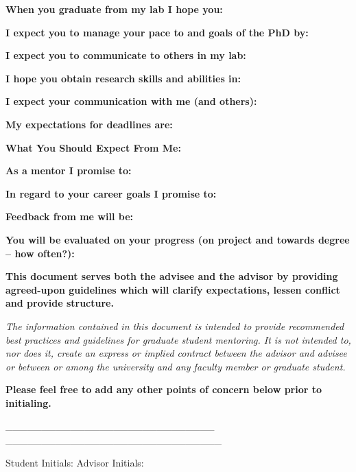 \documentclass[]{article}
\begin{document}
\textbf{When you graduate from my lab I hope you:}

\textbf{I expect you to manage your pace to and goals of the PhD by:\\
}

\textbf{I expect you to communicate to others in my lab:}

\textbf{I hope you obtain research skills and abilities in:}

\textbf{I expect your communication with me (and others):}

\textbf{My expectations for deadlines are:}

\textbf{{What You Should Expect From Me:}}

\textbf{As a mentor I promise to:}

\textbf{In regard to your career goals I promise to:}

\textbf{Feedback from me will be:}

\textbf{You will be evaluated on your progress (on project and towards
degree -- how often?):}

\textbf{This document serves both the advisee and the advisor by
providing agreed-upon guidelines which will clarify expectations, lessen
conflict and provide structure. }

\emph{The information contained in this document is intended to provide
recommended best practices and guidelines for graduate student
mentoring. It is not intended to, nor does it, create an express or
implied contract between the advisor and advisee or between or among the
university and any faculty member or graduate student. }

\textbf{Please feel free to add any other points of concern below prior
to initialing.}


\_\_\_\_\_\_\_\_\_\_\_\_\_\_\_\_\_\_\_\_\_\_\_\_\_\_\_\_\_
\_\_\_\_\_\_\_\_\_\_\_\_\_\_\_\_\_\_\_\_\_\_\_\_\_\_\_\_\_\_

Student Initials: Advisor Initials:
\end{document}
